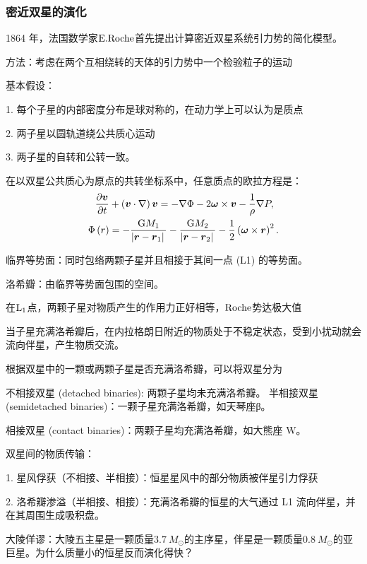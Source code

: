 \documentclass[../天体物理基础.tex]{subfiles}
\begin{document}
\subsubsection{密近双星的演化}
1864 年，法国数学家$\rm E. Roche$首先提出计算密近双星系统引力势的简化模型。

方法：考虑在两个互相绕转的天体的引力势中一个检验粒子的运动

基本假设：

1. 每个子星的内部密度分布是球对称的，在动力学上可以认为是质点

2. 两子星以圆轨道绕公共质心运动

3. 两子星的自转和公转一致。

在以双星公共质心为原点的共转坐标系中，任意质点的欧拉方程是：
\begin{align}
\frac{\partial{}\boldsymbol{v}}{\partial{}t}&+\left(\boldsymbol{v}\cdot\nabla\right)\boldsymbol{v}=-\nabla\Phi-2\boldsymbol{\omega}\times\boldsymbol{v}-\frac{1}{\rho}\nabla P,\notag\\
\Phi\left(r\right)&=-\frac{\mathrm{G}M_{1}}{\left\vert{}\boldsymbol{r}-\boldsymbol{r}_{1}\right\vert{}}-\frac{\mathrm{G}M_{2}}{\left\vert{}\boldsymbol{r}-\boldsymbol{r}_{2}\right\vert{}}-\frac{1}{2}\left(\boldsymbol{\omega}\times\boldsymbol{r}\right)^{2}.
\end{align}

临界等势面：同时包络两颗子星并且相接于其间一点 (L1) 的等势面。


洛希瓣：由临界等势面包围的空间。

在$\rm L_1$点，两颗子星对物质产生的作用力正好相等，$\rm Roche$势达极大值

当子星充满洛希瓣后，在内拉格朗日附近的物质处于不稳定状态，受到小扰动就会流向伴星，产生物质交流。


根据双星中的一颗或两颗子星是否充满洛希瓣，可以将双星分为

不相接双星 (detached binaries): 两颗子星均未充满洛希瓣。
半相接双星 (semidetached binaries)：一颗子星充满洛希瓣，如天琴座β。

相接双星 (contact binaries)：两颗子星均充满洛希瓣，如大熊座 W。

双星间的物质传输：

1. 星风俘获（不相接、半相接）：恒星星风中的部分物质被伴星引力俘获

2. 洛希瓣渗溢（半相接、相接）：充满洛希瓣的恒星的大气通过 L1 流向伴星，并在其周围生成吸积盘。

大陵佯谬：大陵五主星是一颗质量$\qty{3.7}{M_{\odot}}$的主序星，伴星是一颗质量$\qty{0.8}{M_{\odot}}$的亚巨星。为什么质量小的恒星反而演化得快？
\end{document}
